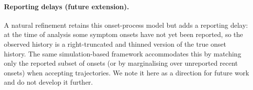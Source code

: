 \documentclass{article}
\theoremstyle{definition}
\begin{document}
\paragraph{Reporting delays (future extension).}
A natural refinement retains this onset-process model but adds a reporting delay:
at the time of analysis some symptom onsets have not yet been reported, so the
observed history is a right-truncated and thinned version of the true onset
history.  The same simulation-based framework accommodates this by matching only
the reported subset of onsets (or by marginalising over unreported recent
onsets) when accepting trajectories.  We note it here as a direction for future
work and do not develop it further.
\end{document}
